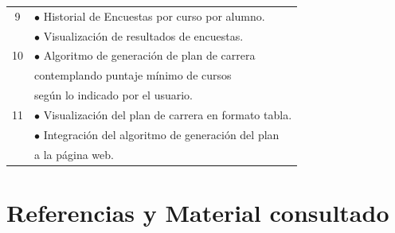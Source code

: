 \documentclass[a4paper]{article}
\begin{document}
\begin{table}[htbp]
\begin{center}
\begin{tabular}{|c|l|}
\hline
9 	& $\bullet$ Historial de Encuestas por curso por alumno.\\
	& $\bullet$ Visualización de resultados de encuestas.\\
\hline
10 	& $\bullet$ Algoritmo de generación de plan de carrera\\
	& contemplando puntaje mínimo de cursos\\
	& según lo indicado por el usuario.\\
\hline
11 	& $\bullet$ Visualización del plan de carrera en formato tabla.\\
	& $\bullet$ Integración del algoritmo de generación del plan\\
	& a la página web.\\
\hline
\end{tabular}
\end{center}
\end{table}

\newpage
\section{Referencias y Material consultado}

\renewcommand\refname{\small}
\end{document}
